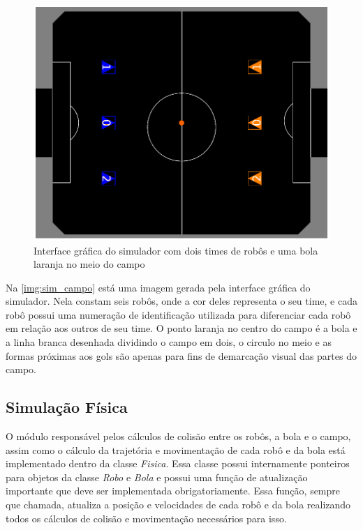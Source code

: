 \begin{figure}[!htb]
    \caption{\label{img:sim_campo}Interface gráfica do simulador com dois times de robôs e uma bola laranja no meio do campo}
	\begin{center}
        \includegraphics[scale=0.38]{img/sim_campo.png}
	\end{center}
\end{figure}

Na \autoref{img:sim_campo} está uma imagem gerada pela interface gráfica do simulador. Nela constam seis robôs, onde a cor deles representa o seu time, e cada robô possui uma numeração de identificação utilizada para diferenciar cada robô em relação aos outros de seu time. O ponto laranja no centro do campo é a bola e a linha branca desenhada dividindo o campo em dois, o circulo no meio e as formas próximas aos gols são apenas para fins de demarcação visual das partes do campo.

\subsection{Simulação Física}

O módulo responsável pelos cálculos de colisão entre os robôs, a bola e o campo, assim como o cálculo da trajetória e movimentação de cada robô e da bola está implementado dentro da classe \textit{Fisica}. Essa classe possui internamente ponteiros para objetos da classe \textit{Robo} e \textit{Bola} e possui uma função de atualização importante que deve ser implementada obrigatoriamente. Essa função, sempre que chamada, atualiza a posição e velocidades de cada robô e da bola realizando todos os cálculos de colisão e movimentação necessários para isso.

